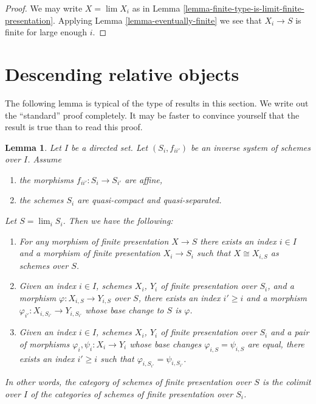 \documentclass{stacks-project}
\theoremstyle{plain}
\newtheorem{lemma}[subsection]{Lemma}
\theoremstyle{definition}
\theoremstyle{remark}
\numberwithin{equation}{subsection}
\def\lim{\mathop{\mathrm{lim}}\nolimits}
\begin{document}
\begin{proof}
We may write $X = \lim X_i$ as in
Lemma \ref{lemma-finite-type-is-limit-finite-presentation}.
Applying Lemma \ref{lemma-eventually-finite} we see that $X_i \to S$
is finite for large enough $i$.
\end{proof}








\section{Descending relative objects}
\label{section-descending-relative}

\noindent
The following lemma is typical of the type of results in this section.
We write out the ``standard'' proof completely. It may be faster to
convince yourself that the result is true than to read this proof.

\begin{lemma}
\label{lemma-descend-finite-presentation}
Let $I$ be a directed set.
Let $(S_i, f_{ii'})$ be an inverse system of schemes over $I$.
Assume
\begin{enumerate}
\item the morphisms $f_{ii'} : S_i \to S_{i'}$ are affine,
\item the schemes $S_i$ are quasi-compact and quasi-separated.
\end{enumerate}
Let $S = \lim_i S_i$. Then we have the following:
\begin{enumerate}
\item For any morphism of finite presentation $X \to S$
there exists an index $i \in I$ and a morphism of finite
presentation $X_i \to S_i$ such that $X \cong X_{i, S}$ as
schemes over $S$.
\item Given an index $i \in I$, schemes
$X_i$, $Y_i$ of finite presentation over $S_i$, and a morphism
$\varphi : X_{i, S} \to Y_{i, S}$ over $S$, there exists an index
$i' \geq i$ and a morphism
$\varphi_{i'} : X_{i, S_{i'}} \to Y_{i, S_{i'}}$
whose base change to $S$ is $\varphi$.
\item Given an index $i \in I$, schemes $X_i$, $Y_i$ of finite presentation
over $S_i$ and a pair of morphisms $\varphi_i, \psi_i : X_i \to Y_i$
whose base changes $\varphi_{i, S} = \psi_{i, S}$ are equal,
there exists an index $i' \geq i$ such that
$\varphi_{i, S_{i'}} = \psi_{i, S_{i'}}$.
\end{enumerate}
In other words, the category of schemes of finite presentation over
$S$ is the colimit over $I$ of the categories of schemes of finite
presentation over $S_i$.
\end{lemma}
\end{document}
